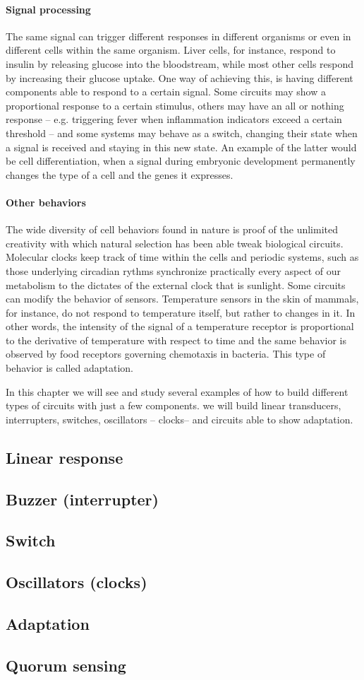\paragraph{Signal processing} The same signal can trigger different responses in different organisms or even in different cells within the same organism. Liver cells, for instance, respond to insulin by releasing glucose into the bloodstream, while most other cells respond by increasing their glucose uptake. One way of achieving this, is having different components able to respond to a certain signal. Some circuits may show a proportional response to a certain stimulus, others may have an all or nothing response -- e.g. triggering fever when inflammation indicators exceed a certain threshold -- and some systems may behave as a switch, changing their state when a signal is received and staying in this new state. An example of the latter would be cell differentiation, when a signal during embryonic development permanently changes the type of a cell and the genes it expresses.

\paragraph{Other behaviors} The wide diversity of cell behaviors found in nature is proof of the unlimited creativity with which natural selection has been able tweak biological circuits. Molecular clocks keep track of time within the cells and periodic systems, such as those underlying circadian rythms synchronize practically every aspect of our metabolism to the dictates of the  external clock that is sunlight. Some circuits can modify the behavior of sensors. Temperature sensors in the skin of mammals, for instance, do not respond to temperature itself, but rather to changes in it. In other words, the intensity of the signal of a temperature receptor is proportional to the derivative of temperature with respect to time and the same behavior is observed by food receptors governing chemotaxis in bacteria. This type of behavior is called adaptation. 


In this chapter we will see and study several examples of how to build different types of circuits with just a few components. we will build linear transducers, interrupters, switches, oscillators -- clocks-- and circuits able to show adaptation.

\subsection{Linear response}
\subsection{Buzzer (interrupter)}
\subsection{Switch}
\subsection{Oscillators (clocks)}
\subsection{Adaptation}
\subsection{Quorum sensing}